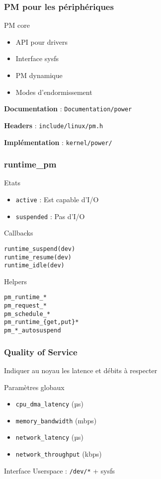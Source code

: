 \begin{frame}[fragile]
	\frametitle{PM pour les périphériques}
	\begin{block}{PM core}
		\begin{itemize}
			\item API pour drivers
			\item Interface sysfs
			\item PM dynamique
			\item Modes d'endormissement
		\end{itemize}
	\end{block}
	\textbf{Documentation} : \texttt{Documentation/power}

	\textbf{Headers} : \texttt{include/linux/pm.h}

	\textbf{Implémentation} : \texttt{kernel/power/}
\end{frame}
\begin{frame}[fragile]
	\frametitle{runtime\_pm}
	\begin{block}{Etats}
		\begin{itemize}
			\item \texttt{active} : Est capable d'I/O
			\item \texttt{suspended} : Pas d'I/O
		\end{itemize}
	\end{block}
	\begin{minipage}[t]{0.45\linewidth}
		\begin{center}Callbacks\end{center}
		\begin{verbatim}
runtime_suspend(dev)
runtime_resume(dev)
runtime_idle(dev)
		\end{verbatim}
	\end{minipage}
	\begin{minipage}[t]{0.45\linewidth}
		\begin{center}Helpers\end{center}
		\begin{verbatim}
pm_runtime_*
pm_request_*
pm_schedule_*
pm_runtime_{get,put}*
pm_*_autosuspend
		\end{verbatim}
	\end{minipage}
\end{frame}
\begin{frame}
	\frametitle{Quality of Service}
	Indiquer au noyau les latence et débits à respecter
	\begin{block}{Paramètres globaux}
		\begin{itemize}
			\item \texttt{cpu\_dma\_latency} (µs)
			\item \texttt{memory\_bandwidth} (mbps)
			\item \texttt{network\_latency} (µs)
			\item \texttt{network\_throughput} (kbps)
		\end{itemize}
	\end{block}
	Interface Userspace : \texttt{/dev/*} + sysfs
\end{frame}


